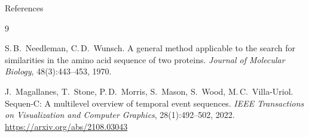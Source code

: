 \documentclass[aspectratio=169,t]{beamer}
\begin{document}
\begin{frame}{References}
  \begin{thebibliography}{9}

      S.\,B.~Needleman, C.\,D.~Wunsch.
      \newblock A general method applicable to the search for similarities in the amino acid sequence of two proteins.
      \textit{Journal of Molecular Biology}, 48(3):443--453, 1970.

      J.~Magallanes, T.~Stone, P.\,D.~Morris, S.~Mason, S.~Wood, M.\,C.~Villa-Uriol.
      \newblock Sequen-C: A multilevel overview of temporal event sequences.
      \textit{IEEE Transactions on Visualization and Computer Graphics}, 28(1):492--502, 2022.\\
      \url{https://arxiv.org/abs/2108.03043}

  \end{thebibliography}
\end{frame}
\end{document}
